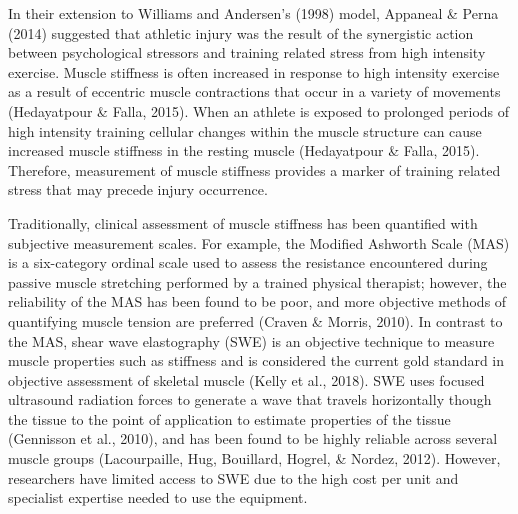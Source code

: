 \documentclass[
  english,
  man,floatsintext]{apa6}
\begin{document}
In their extension to Williams and Andersen's (1998) model, Appaneal \& Perna (2014) suggested that athletic injury was the result of the synergistic action between psychological stressors and training related stress from high intensity exercise.
Muscle stiffness is often increased in response to high intensity exercise as a result of eccentric muscle contractions that occur in a variety of movements (Hedayatpour \& Falla, 2015).
When an athlete is exposed to prolonged periods of high intensity training cellular changes within the muscle structure can cause increased muscle stiffness in the resting muscle (Hedayatpour \& Falla, 2015).
Therefore, measurement of muscle stiffness provides a marker of training related stress that may precede injury occurrence.

Traditionally, clinical assessment of muscle stiffness has been quantified with subjective measurement scales.
For example, the Modified Ashworth Scale (MAS) is a six-category ordinal scale used to assess the resistance encountered during passive muscle stretching performed by a trained physical therapist; however, the reliability of the MAS has been found to be poor, and more objective methods of quantifying muscle tension are preferred (Craven \& Morris, 2010).
In contrast to the MAS, shear wave elastography (SWE) is an objective technique to measure muscle properties such as stiffness and is considered the current gold standard in objective assessment of skeletal muscle (Kelly et al., 2018).
SWE uses focused ultrasound radiation forces to generate a wave that travels horizontally though the tissue to the point of application to estimate properties of the tissue (Gennisson et al., 2010),
and has been found to be highly reliable across several muscle groups (Lacourpaille, Hug, Bouillard, Hogrel, \& Nordez, 2012).
However, researchers have limited access to SWE due to the high cost per unit and specialist expertise needed to use the equipment.
\end{document}
